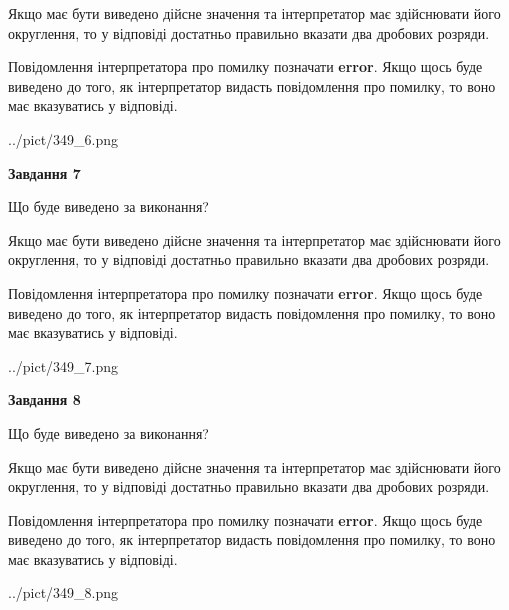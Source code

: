 \documentclass[12pt, ukrainian]{article}
\begin{document}
{\begin {Large}
Якщо має бути виведено дійсне значення та інтерпретатор має здійснювати його округлення, 
то у відповіді достатньо правильно вказати два дробових розряди.

Повідомлення інтерпретатора про помилку позначати \textbf{error}.
Якщо щось буде виведено до того, як інтерпретатор видасть повідомлення про помилку, 
то воно має вказуватись у відповіді. \par

\begin{center}
	{../pict/349_6.png}
\end{center}
\newpage

{\begin {center}\textbf{Завдання 7}\end {center}}\par
Що буде виведено за виконання? \par

Якщо має бути виведено дійсне значення та інтерпретатор має здійснювати його округлення, 
то у відповіді достатньо правильно вказати два дробових розряди.

Повідомлення інтерпретатора про помилку позначати \textbf{error}.
Якщо щось буде виведено до того, як інтерпретатор видасть повідомлення про помилку, 
то воно має вказуватись у відповіді. \par

\begin{center}
	{../pict/349_7.png}
\end{center}
\newpage

{\begin {center}\textbf{Завдання 8}\end {center}}\par
Що буде виведено за виконання? \par

Якщо має бути виведено дійсне значення та інтерпретатор має здійснювати його округлення, 
то у відповіді достатньо правильно вказати два дробових розряди.

Повідомлення інтерпретатора про помилку позначати \textbf{error}.
Якщо щось буде виведено до того, як інтерпретатор видасть повідомлення про помилку, 
то воно має вказуватись у відповіді. \par

\begin{center}
	{../pict/349_8.png}
\end{center}
\newpage


\end{Large}}
\end{document}
